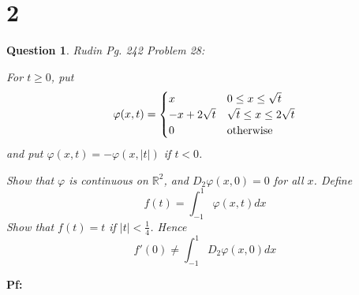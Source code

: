 \documentclass{article}
\newtheorem{question}{Question}
\begin{document}
\section*{2}
\begin{myBox}[]{}
    \begin{question}
        Rudin Pg. 242 Problem 28:

        For $t\geq 0$, put 
        $$\varphi(x,t)=\begin{cases}
            x & 0\leq x\leq \sqrt{t}\\
            -x+2\sqrt{t} & \sqrt{t}\leq x\leq 2\sqrt{t}\\
            0 & \textmd{otherwise}
        \end{cases}$$
        and put $\varphi(x,t)=-\varphi(x,|t|)$ if $t<0$.

        Show that $\varphi$ is continuous on $\mathbb{R}^2$, and $D_2\varphi(x,0)=0$ for all $x$. Define 
        $$f(t)=\int_{-1}^{1}\varphi(x,t)dx$$
        Show that $f(t)=t$ if $|t|<\frac{1}{4}$. Hence 
        $$f'(0)\neq \int_{-1}^{1}D_2\varphi(x,0)dx$$
    \end{question}
\end{myBox}

\textbf{Pf:}

\break
\end{document}
